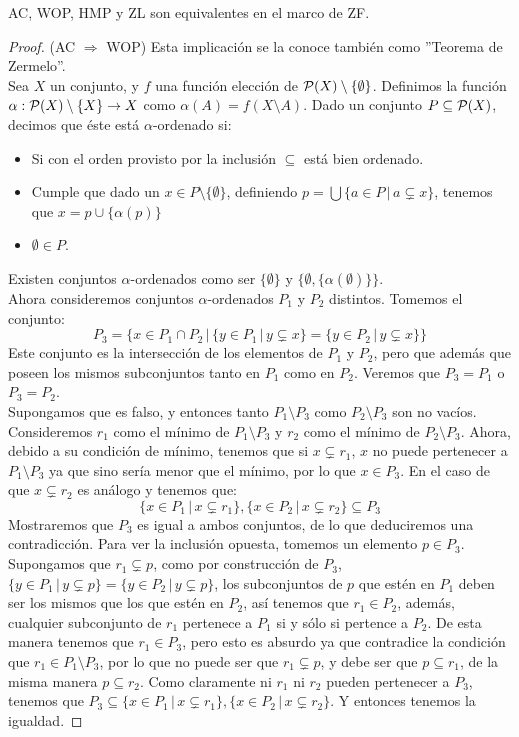 \documentclass[12pt,a4paper]{book}
\begin{document}
\begin{teo}
AC, WOP, HMP y ZL son equivalentes en el marco de ZF.
\begin{proof} 

(AC $\Rightarrow$ WOP) Esta implicación se la conoce también como ''Teorema de Zermelo''.\\
Sea $X$ un conjunto, y $f$ una función elección de $\P(X) \setminus \{\emptyset\}$. Definimos la función $\alpha: \P(X) \setminus \{X\} \rightarrow X$ como $\alpha(A)= f(X \setminus A)$. Dado un conjunto $ P \subseteq \P(X)$, decimos que éste está $\alpha$-ordenado si:
\begin{itemize}
\item Si con el orden provisto por la inclusión $\subseteq$ está bien ordenado.
\item Cumple que dado un $x \in P\setminus \{\emptyset\}$, definiendo $ p = \bigcup \{ a \in P \,\vert\, a \subsetneq x \}$, tenemos que $x = p \cup \{\alpha(p)\}$
\item $\emptyset \in P$.
\end{itemize}
Existen conjuntos $\alpha$-ordenados como ser $\{\emptyset\}$ y $\{\emptyset, \{\alpha(\emptyset)\}\}$.\\
Ahora consideremos conjuntos $\alpha$-ordenados $P_1$ y $P_2$ distintos. Tomemos el conjunto:
$$ P_3 = \{ x \in P_1 \cap P_2 \,\vert\, \{ y \in P_1 \,\vert\, y \subsetneq x\} = \{ y \in P_2 \,\vert\, y \subsetneq x\}\}$$
Este conjunto es la intersección de los elementos de $P_1$ y $P_2$, pero que además que poseen los mismos subconjuntos tanto en $P_1$ como en $P_2$. Veremos que $P_3 = P_1$ o $P_3 = P_2$.\\
Supongamos que es falso, y entonces tanto $P_1 \setminus P_3$ como $P_2 \setminus P_3$ son no vacíos. Consideremos $r_1$ como el mínimo de $P_1 \setminus P_3$ y $r_2$ como el mínimo de $P_2 \setminus P_3$. Ahora, debido a su condición de mínimo, tenemos que si $x \subsetneq r_1$, $x$ no puede pertenecer a $P_1 \setminus P_3$ ya que sino sería menor que el mínimo, por lo que $x \in P_3$. En el caso de que $x \subsetneq r_2$ es análogo y tenemos que:
$$\{x \in P_1 \,\vert\, x \subsetneq r_1\},\{x \in P_2 \,\vert\, x \subsetneq r_2\} \subseteq P_3$$
Mostraremos que $P_3$ es igual a ambos conjuntos, de lo que deduciremos una contradicción. Para ver la inclusión opuesta, tomemos un elemento $p \in P_3$. Supongamos que $r_1 \subsetneq p$, como por construcción de $P_3$, $\{ y \in P_1 \,\vert\, y \subsetneq p\} = \{ y \in P_2 \,\vert\, y \subsetneq p\}$, los subconjuntos de $p$ que estén en $P_1$ deben ser los mismos que los que estén en $P_2$,  así tenemos que $r_1 \in P_2$, además, cualquier subconjunto de $r_1$ pertenece a $P_1$ si y sólo si pertence a $P_2$. De esta manera tenemos que $r_1 \in P_3$, pero esto es absurdo ya que contradice la condición que $r_1 \in P_1 \setminus P_3$, por lo que no puede ser que $r_1 \subsetneq p$, y debe ser que $p \subseteq r_1$, de la misma manera $p \subseteq r_2$. Como claramente ni $r_1$ ni $r_2$ pueden pertenecer a $P_3$, tenemos que $P_3 \subseteq \{x \in P_1 \,\vert\, x \subsetneq r_1\} ,\{x \in P_2 \,\vert\, x \subsetneq r_2\}$.  Y entonces tenemos la igualdad.

\end{proof}
\end{teo}
\end{document}
